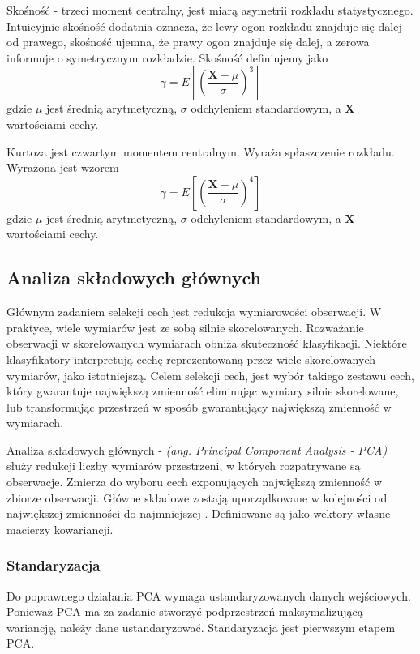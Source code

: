 \documentclass[a4paper,12pt,twoside,openany]{report}
\newcommand{\ang}[1]{\textit{(ang. #1)}}
\renewcommand{\vec}[1]{\bm{#1}}
\begin{document}
Skośność - trzeci moment centralny, jest miarą asymetrii rozkładu statystycznego. 
Intuicyjnie skośność dodatnia oznacza, że lewy ogon rozkładu znajduje się dalej od prawego,
skośność ujemna, że prawy ogon znajduje się dalej,
a zerowa informuje o symetrycznym rozkładzie.
Skośność definiujemy jako
\begin{equation}
	\gamma = E \left [ \left (  \frac{\vec X - \mu}{ \sigma }   \right )^3 \right ]
\end{equation}
gdzie $\mu$ jest średnią arytmetyczną, $\sigma$ odchyleniem standardowym, a $\vec X$ wartościami cechy.

Kurtoza jest czwartym momentem centralnym.
Wyraża spłaszczenie rozkładu. 
Wyrażona jest wzorem
\begin{equation}
	\gamma = E \left [ \left (  \frac{\vec X - \mu}{ \sigma }   \right )^4 \right ]
\end{equation}
gdzie $\mu$ jest średnią arytmetyczną, $\sigma$ odchyleniem standardowym, a $\vec X$ wartościami cechy.
\subsection{Analiza składowych głównych}\label{sec:pca}
Głównym zadaniem selekcji cech jest redukcja wymiarowości obserwacji.
W praktyce, wiele wymiarów jest ze sobą silnie skorelowanych.
Rozważanie obserwacji w skorelowanych wymiarach obniża skuteczność klasyfikacji.
Niektóre klasyfikatory interpretują cechę reprezentowaną przez wiele skorelowanych wymiarów, jako istotniejszą.
Celem selekcji cech, jest wybór takiego zestawu cech, który gwarantuje największą zmienność eliminując wymiary silnie skorelowane, 
lub transformując przestrzeń w sposób gwarantujący największą zmienność w wymiarach.

Analiza składowych głównych - \ang{Principal Component Analysis - PCA} służy redukcji liczby wymiarów przestrzeni,
w których rozpatrywane są obserwacje.
Zmierza do wyboru cech exponujących największą zmienność w zbiorze obserwacji.
Główne składowe zostają uporządkowane w kolejności od największej zmienności do najmniejszej \cite{Bro2014}.
Definiowane są jako wektory własne macierzy kowariancji.

\subsubsection{Standaryzacja}
Do poprawnego działania PCA wymaga ustandaryzowanych danych wejściowych.
Ponieważ PCA ma za zadanie stworzyć podprzestrzeń maksymalizującą wariancję,
należy dane ustandaryzować.
Standaryzacja jest pierwszym etapem PCA.
\end{document}

